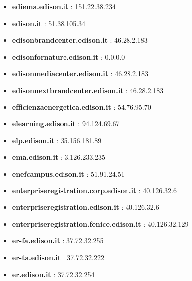 \documentclass{article}
\begin{document}
\begin{itemize}
            \item \textbf{ ediema.edison.it }: 151.22.38.234
        
            \item \textbf{ edison.it }: 51.38.105.34
        
            \item \textbf{ edisonbrandcenter.edison.it }: 46.28.2.183
        
            \item \textbf{ edisonfornature.edison.it }: 0.0.0.0
        
            \item \textbf{ edisonmediacenter.edison.it }: 46.28.2.183
        
            \item \textbf{ edisonnextbrandcenter.edison.it }: 46.28.2.183
        
            \item \textbf{ efficienzaenergetica.edison.it }: 54.76.95.70
        
            \item \textbf{ elearning.edison.it }: 94.124.69.67
        
            \item \textbf{ elp.edison.it }: 35.156.181.89
        
            \item \textbf{ ema.edison.it }: 3.126.233.235
        
            \item \textbf{ enefcampus.edison.it }: 51.91.24.51
        
            \item \textbf{ enterpriseregistration.corp.edison.it }: 40.126.32.6
        
            \item \textbf{ enterpriseregistration.edison.it }: 40.126.32.6
        
            \item \textbf{ enterpriseregistration.fenice.edison.it }: 40.126.32.129
        
            \item \textbf{ er-fa.edison.it }: 37.72.32.255
        
            \item \textbf{ er-ta.edison.it }: 37.72.32.222
        
            \item \textbf{ er.edison.it }: 37.72.32.254
        

\end{itemize}
\end{document}
